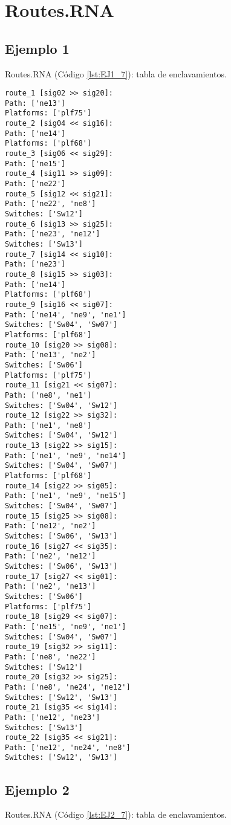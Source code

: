 \chapter{Routes.RNA}
	\label{sec:routesRNA}
	
	\section{Ejemplo 1}
		Routes.RNA (Código \ref{lst:EJ1_7}): tabla de enclavamientos.
	
		\begin{lstlisting}[language = {}, caption = Routes.RNA, label = {lst:EJ1_7}]
route_1 [sig02 >> sig20]:
Path: ['ne13']
Platforms: ['plf75']
route_2 [sig04 << sig16]:
Path: ['ne14']
Platforms: ['plf68']
route_3 [sig06 << sig29]:
Path: ['ne15']
route_4 [sig11 >> sig09]:
Path: ['ne22']
route_5 [sig12 << sig21]:
Path: ['ne22', 'ne8']
Switches: ['Sw12']
route_6 [sig13 >> sig25]:
Path: ['ne23', 'ne12']
Switches: ['Sw13']
route_7 [sig14 << sig10]:
Path: ['ne23']
route_8 [sig15 >> sig03]:
Path: ['ne14']
Platforms: ['plf68']
route_9 [sig16 << sig07]:
Path: ['ne14', 'ne9', 'ne1']
Switches: ['Sw04', 'Sw07']
Platforms: ['plf68']
route_10 [sig20 >> sig08]:
Path: ['ne13', 'ne2']
Switches: ['Sw06']
Platforms: ['plf75']
route_11 [sig21 << sig07]:
Path: ['ne8', 'ne1']
Switches: ['Sw04', 'Sw12']
route_12 [sig22 >> sig32]:
Path: ['ne1', 'ne8']
Switches: ['Sw04', 'Sw12']
route_13 [sig22 >> sig15]:
Path: ['ne1', 'ne9', 'ne14']
Switches: ['Sw04', 'Sw07']
Platforms: ['plf68']
route_14 [sig22 >> sig05]:
Path: ['ne1', 'ne9', 'ne15']
Switches: ['Sw04', 'Sw07']
route_15 [sig25 >> sig08]:
Path: ['ne12', 'ne2']
Switches: ['Sw06', 'Sw13']
route_16 [sig27 << sig35]:
Path: ['ne2', 'ne12']
Switches: ['Sw06', 'Sw13']
route_17 [sig27 << sig01]:
Path: ['ne2', 'ne13']
Switches: ['Sw06']
Platforms: ['plf75']
route_18 [sig29 << sig07]:
Path: ['ne15', 'ne9', 'ne1']
Switches: ['Sw04', 'Sw07']
route_19 [sig32 >> sig11]:
Path: ['ne8', 'ne22']
Switches: ['Sw12']
route_20 [sig32 >> sig25]:
Path: ['ne8', 'ne24', 'ne12']
Switches: ['Sw12', 'Sw13']
route_21 [sig35 << sig14]:
Path: ['ne12', 'ne23']
Switches: ['Sw13']
route_22 [sig35 << sig21]:
Path: ['ne12', 'ne24', 'ne8']
Switches: ['Sw12', 'Sw13']
		\end{lstlisting}	
	\section{Ejemplo 2}
	Routes.RNA (Código \ref{lst:EJ2_7}): tabla de enclavamientos.
	
